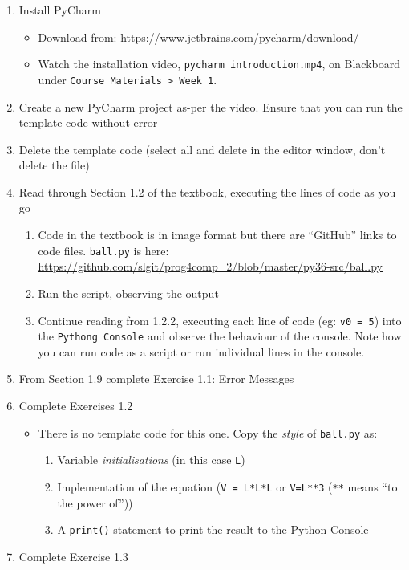 \documentclass{lab}
\begin{document}
\begin{enumerate}
\item Install PyCharm
	\begin{itemize}
		\item Download from: \url{https://www.jetbrains.com/pycharm/download/}
		\item Watch the installation video, \texttt{pycharm introduction.mp4}, on Blackboard under \texttt{Course Materials > Week 1}.
	\end{itemize}
\item Create a new PyCharm project as-per the video. Ensure that you can run the template code without error
\item Delete the template code (select all and delete in the editor window, don't delete the file)
\item Read through Section 1.2 of the textbook, executing the lines of code as you go
	\begin{enumerate}
		\item Code in the textbook is in image format but there are ``GitHub'' links to code files. \texttt{ball.py} is here: \url{https://github.com/slgit/prog4comp_2/blob/master/py36-src/ball.py}
		\item Run the script, observing the output
		\item Continue reading from 1.2.2, executing each line of code (eg: \texttt{v0 = 5}) into the \texttt{Pythong Console} and observe the behaviour of the console. Note how you can run code as a script or run individual lines in the console.
	\end{enumerate}
\item From Section 1.9 complete Exercise 1.1: Error Messages
\item Complete Exercises 1.2
	\begin{itemize}
		\item There is no template code for this one. Copy the \textit{style} of \texttt{ball.py} as:
			\begin{enumerate}
				\item Variable \textit{initialisations} (in this case \texttt{L})
				\item Implementation of the equation (\texttt{V = L*L*L} or \texttt{V=L**3} (\texttt{**} means ``to the power of''))
				\item A \texttt{print()} statement to print the result to the Python Console
			\end{enumerate}
	\end{itemize}
\item Complete Exercise 1.3
\end{enumerate}
\end{document}
